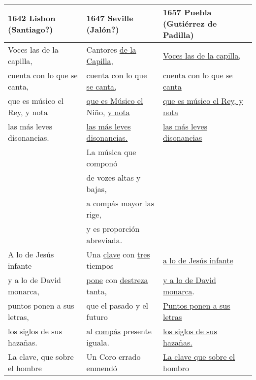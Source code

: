 \documentclass{tex/vcbook-float}
\begin{document}
\begin{tabular}{lll}
    \toprule
    1642 Lisbon (Santiago?) & 
    1647 Seville (Jalón?) & 
    1657 Puebla (Gutiérrez de Padilla) \\
    \midrule 
    
    \strophe{} Voces las de la capilla,    &
    \strophe{} Cantores \uline{de la Capilla,} &
    \strophe{} \uline{Voces las de la capilla,} \\

    cuenta con lo que se canta, &
    \uline{cuenta con lo que se canta,} &
    \uline{cuenta con lo que se canta} \\

    que es músico el Rey, y nota &
    \uline{que es Músico el} Niño, \uline{y nota} &
    \uline{que es músico el Rey, y nota} \\

    las más leves disonancias. &
    \uline{las más leves disonancias.} &
    \uline{las más leves disonancias} \\

    & 
    \strophe{} La música que componó 
    & \\

    & 
    de vozes altas y bajas, 
    & \\

    & 
    a compás mayor las rige, 
    & \\

    & 
    y es proporción abreviada. 
    & \\

 
    \strophe{} A lo de Jesús infante & 
    \strophe{} Una \uline{clave} con \uline{tres} tiempos &
    \uline{a lo de Jesús infante} \\

    y a lo de David monarca, & 
    \uline{pone} con \uline{destreza} tanta, &
    \uline{y a lo de David monarca}. \\

    puntos ponen a sus letras,
    & que el pasado y el futuro &
    \strophe{} \uline{Puntos ponen a sus letras} \\

    los siglos de sus hazañas.
    & al \uline{compás} presente iguala. &
    \uline{los siglos de sus hazañas.} \\

    \strophe{} La clave, que sobre el hombre
    & \strophe{} Un Coro errado enmendó &
    \uline{La clave que sobre el} hombro \\


\end{tabular}
\end{document}

